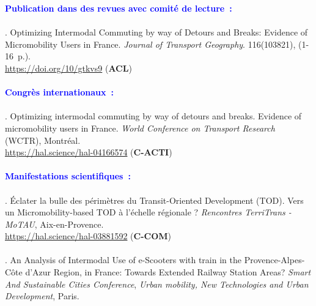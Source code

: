 \begin{refsegment}
     \newpage
     
    \begin{tcolorbox}[colback=white!5!white,
                      colframe=blue!75!blue,
                      title=Valorisation scientifique
                      \\
                      Chapitre~5]
\Large{\textcolor{blue}{\textbf{Publication dans des revues avec comité de lecture~:}}}
    \\\\
\small{\textcolor{blue}{\textcite{moinse_optimizing_2024}}. Optimizing Intermodal Commuting by way of Detours and Breaks: Evidence of Micromobility Users in France. \textsl{Journal of Transport Geography}. 116(103821), (1-16~p.).
\\
\footnotesize{\url{https://doi.org/10/gtkvs9}} (\textbf{ACL})}
    \\\\
\Large{\textcolor{blue}{\textbf{Congrès internationaux~:}}}
    \\\\
\small{\textcolor{blue}{\textcite{moinse_optimizing_2023}}. Optimizing intermodal commuting by way of detours and breaks. Evidence of micromobility users in France. \textsl{World Conference on Transport Research} (WCTR), Montréal. 
\\
\footnotesize{\url{https://hal.science/hal-04166574}} (\textbf{C-ACTI})}
    \\\\
\Large{\textcolor{blue}{\textbf{Manifestations scientifiques~:}}}
    \\\\
\small{\textcolor{blue}{\textcite{moinse_eclater_2022}}. Éclater la bulle des périmètres du Transit-Oriented Development (TOD). Vers un Micromobility-based TOD à l'échelle régionale ? \textsl{Rencontres TerriTrans - MoTAU}, Aix-en-Provence. 
\\
\footnotesize{\url{https://hal.science/hal-03881592}} (\textbf{C-COM})}
    \\\\
\small{\textcolor{blue}{\textcite{moinse_analysis_2021}}. An Analysis of Intermodal Use of e-Scooters with train in the Provence-Alpes-Côte d’Azur Region, in France: Towards Extended Railway Station Areas? \textsl{Smart And Sustainable Cities Conference}, \textsl{Urban mobility, New Technologies and Urban Development}, Paris.
\\
}
\end{tcolorbox}
\end{refsegment}

